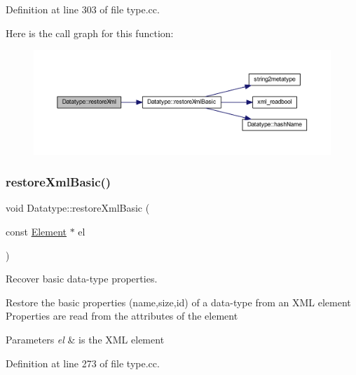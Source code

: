 Definition at line 303 of file type.\+cc.

Here is the call graph for this function\+:
\nopagebreak
\begin{figure}[H]
\begin{center}
\leavevmode
\includegraphics[width=350pt]{class_datatype_aed882ae693a31a64d56fffb9abdaa575_cgraph}
\end{center}
\end{figure}
\mbox{\label{class_datatype_afeb70488c52d024b293d5198c98b3f49}} 
\subsubsection{\texorpdfstring{restoreXmlBasic()}{restoreXmlBasic()}}
{\footnotesize\ttfamily void Datatype\+::restore\+Xml\+Basic (\begin{DoxyParamCaption}\item[{const \mbox{\hyperlink{class_element}{Element}} $\ast$}]{el }\end{DoxyParamCaption})\hspace{0.3cm}{\ttfamily [protected]}}



Recover basic data-\/type properties. 

Restore the basic properties (name,size,id) of a data-\/type from an X\+ML element Properties are read from the attributes of the element 
\begin{DoxyParams}{Parameters}
{\em el} & is the X\+ML element \\
\hline
\end{DoxyParams}


Definition at line 273 of file type.\+cc.

